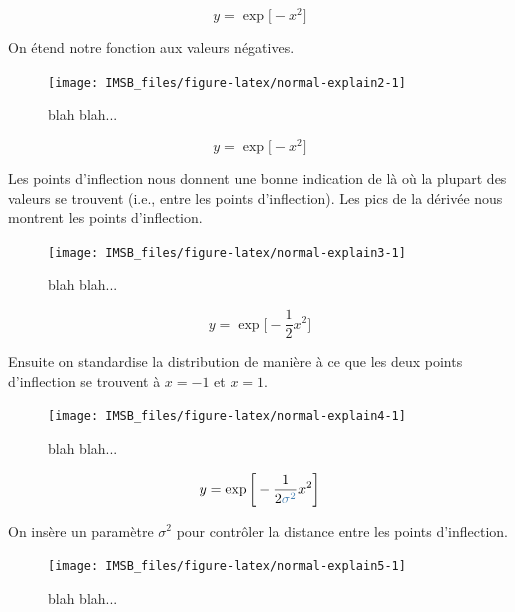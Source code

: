 \documentclass[
  a4paper,11pt,twoside,onecolumn,openright,final,oldfontcommands]{memoir}
\theoremstyle{definition}
\theoremstyle{definition}
\theoremstyle{definition}
\theoremstyle{definition}
\theoremstyle{remark}
\begin{document}
\[
y = \exp \big[-x^{2} \big]
\]

On étend notre fonction aux valeurs négatives.

\begin{figure}[!htb]

{\centering \texttt{[image: IMSB\_files/figure-latex/normal-explain2-1]} 

}

\caption{blah blah...}\label{fig:normal-explain2}
\end{figure}

\[
y = \exp \big[-x^{2} \big]
\]

Les points d'inflection nous donnent une bonne indication de là où la plupart des valeurs se trouvent (i.e., entre les points d'inflection). Les pics de la dérivée nous montrent les points d'inflection.

\begin{figure}[!htb]

{\centering \texttt{[image: IMSB\_files/figure-latex/normal-explain3-1]} 

}

\caption{blah blah...}\label{fig:normal-explain3}
\end{figure}

\[
y = \exp \bigg [- \frac{1}{2} x^{2} \bigg]
\]

Ensuite on standardise la distribution de manière à ce que les deux points d'inflection se trouvent à \(x = -1\) et \(x = 1\).

\begin{figure}[!htb]

{\centering \texttt{[image: IMSB\_files/figure-latex/normal-explain4-1]} 

}

\caption{blah blah...}\label{fig:normal-explain4}
\end{figure}

\[
y = \exp \bigg [- \frac{1}{2 \color{steelblue}{\sigma^{2}}} x^{2} \bigg]
\]

On insère un paramètre \(\sigma^{2}\) pour contrôler la distance entre les points d'inflection.

\begin{figure}[!htb]

{\centering \texttt{[image: IMSB\_files/figure-latex/normal-explain5-1]} 

}

\caption{blah blah...}\label{fig:normal-explain5}
\end{figure}
\end{document}
